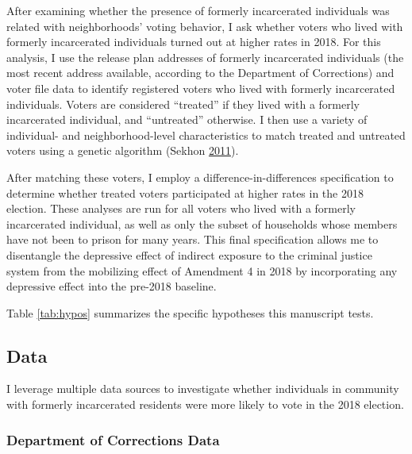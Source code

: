 \documentclass[
  12pt,
]{article}
\begin{document}
After examining whether the presence of formerly incarcerated individuals was related with neighborhoods' voting behavior, I ask whether voters who lived with formerly incarcerated individuals turned out at higher rates in 2018. For this analysis, I use the release plan addresses of formerly incarcerated individuals (the most recent address available, according to the Department of Corrections) and voter file data to identify registered voters who lived with formerly incarcerated individuals. Voters are considered ``treated'' if they lived with a formerly incarcerated individual, and ``untreated'' otherwise. I then use a variety of individual- and neighborhood-level characteristics to match treated and untreated voters using a genetic algorithm (Sekhon \protect\hyperlink{ref-Sekhon2011}{2011}).

After matching these voters, I employ a difference-in-differences specification to determine whether treated voters participated at higher rates in the 2018 election. These analyses are run for all voters who lived with a formerly incarcerated individual, as well as only the subset of households whose members have not been to prison for many years. This final specification allows me to disentangle the depressive effect of indirect exposure to the criminal justice system from the mobilizing effect of Amendment 4 in 2018 by incorporating any depressive effect into the pre-2018 baseline.

Table \ref{tab:hypos} summarizes the specific hypotheses this manuscript tests.



\hypertarget{data}{%
\subsection*{Data}\label{data}}

I leverage multiple data sources to investigate whether individuals in community with formerly incarcerated residents were more likely to vote in the 2018 election.

\hypertarget{department-of-corrections-data}{%
\subsubsection*{Department of Corrections Data}\label{department-of-corrections-data}}
\end{document}
